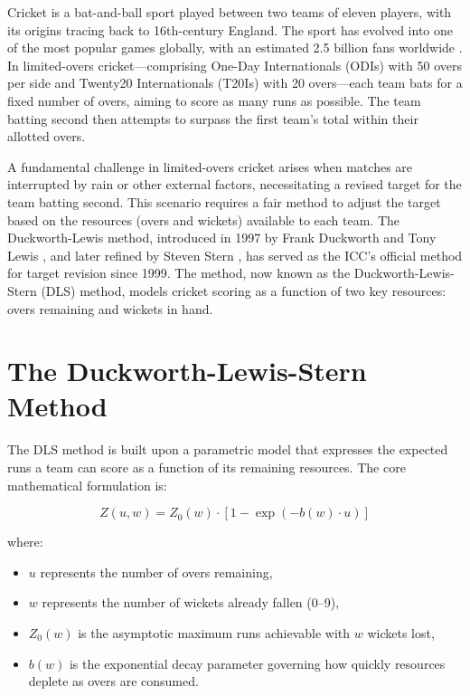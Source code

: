 \documentclass[12pt,a4paper,oneside]{report}
\begin{document}
Cricket is a bat-and-ball sport played between two teams of eleven players, with its origins tracing back to 16th-century England. The sport has evolved into one of the most popular games globally, with an estimated 2.5 billion fans worldwide \citep{icc2023}. In limited-overs cricket---comprising One-Day Internationals (ODIs) with 50 overs per side and Twenty20 Internationals (T20Is) with 20 overs---each team bats for a fixed number of overs, aiming to score as many runs as possible. The team batting second then attempts to surpass the first team's total within their allotted overs.

A fundamental challenge in limited-overs cricket arises when matches are interrupted by rain or other external factors, necessitating a revised target for the team batting second. This scenario requires a fair method to adjust the target based on the resources (overs and wickets) available to each team. The Duckworth-Lewis method, introduced in 1997 by Frank Duckworth and Tony Lewis \citep{duckworth1998}, and later refined by Steven Stern \citep{stern2016}, has served as the ICC's official method for target revision since 1999. The method, now known as the Duckworth-Lewis-Stern (DLS) method, models cricket scoring as a function of two key resources: overs remaining and wickets in hand.

\section{The Duckworth-Lewis-Stern Method}

The DLS method is built upon a parametric model that expresses the expected runs a team can score as a function of its remaining resources. The core mathematical formulation is:

\begin{equation}
Z(u, w) = Z_0(w) \cdot \left[1 - \exp\left(-b(w) \cdot u\right)\right]
\label{eq:dls}
\end{equation}

\noindent where:
\begin{itemize}[nosep]
    \item $u$ represents the number of overs remaining,
    \item $w$ represents the number of wickets already fallen (0--9),
    \item $Z_0(w)$ is the asymptotic maximum runs achievable with $w$ wickets lost,
    \item $b(w)$ is the exponential decay parameter governing how quickly resources deplete as overs are consumed.
\end{itemize}
\end{document}
